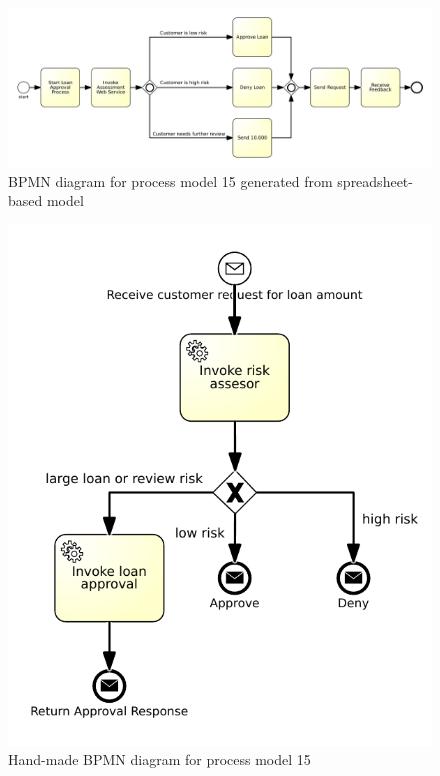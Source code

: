 \begin{figure}[H]
	\centering
	\includegraphics[width=\hsize]{./generated_bpmn/model15.pdf}
	\caption{BPMN diagram for process model 15 generated from spreadsheet-based model}
	\label{bpmn:generated_model15}
\end{figure}

\begin{figure}[H]
	\centering
	\includegraphics[scale=1.0]{./bpmn/model15.pdf}
	\caption{Hand-made BPMN diagram for process model 15}
	\label{bpmn:model15}
\end{figure}

